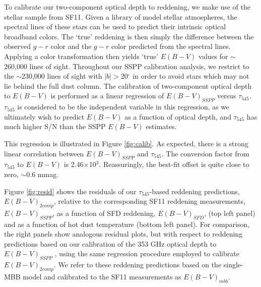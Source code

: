 \documentclass{emulateapj}
\begin{document}
To calibrate our two-component optical depth to reddening, we make use of the 
stellar sample from SF11. Given a library of model stellar atmospheres, the 
spectral lines of these stars can be used to predict their intrinsic optical 
broadband colors. The `true' reddening is then simply the difference between 
the observed $g-r$ color and the $g-r$ color predicted from the spectral lines.
Applying a color transformation then yields `true' $E(B-V)$ values for 
$\sim$260,000 lines of sight. Throughout our SSPP calibration analysis, we 
restrict to the $\sim$230,000 lines of sight with $|b|$$>$20$^{\circ}$ in order
to avoid stars which may not lie behind the full dust column. The calibration 
of two-component optical depth to $E(B-V)$ is performed as a linear regression 
of $E(B-V)_{SSPP}$ versus $\tau_{545}$. $\tau_{545}$ is considered to be the 
independent variable in this regression, as we ultimately wish to predict 
$E(B-V)$ as a function of optical depth, and $\tau_{545}$ has much higher S/N 
than the SSPP $E(B-V)$ estimates.



This regression is illustrated in Figure \ref{fig:calib}. As expected, there 
is a strong linear correlation between $E(B-V)_{SSPP}$ and $\tau_{545}$. The 
conversion factor from $\tau_{545}$ to $E(B-V)$ is 2.46$\times$10$^{3}$. 
Reassuringly, the best-fit offset is quite close to zero, $\sim$0.6 mmag.

Figure \ref{fig:resid} shows the residuals of our $\tau_{545}$-based reddening 
predictions, $E(B-V)_{2comp}$, relative to the corresponding SF11 reddening 
measurements, $E(B-V)_{SSPP}$, as a function of SFD reddening, $E(B-V)_{SFD}$, 
(top left panel) and as a function of hot dust temperature (bottom left panel).
For comparison, the right panels show analogous residual plots, but with 
respect to reddening predictions based on our calibration of the 
\cite{planckdust} 353 GHz optical depth to $E(B-V)_{SSPP}$ , using the same 
regression procedure employed to calibrate $E(B-V)_{2comp}$. We refer to these 
reddening predictions based on the \cite{planckdust} single-MBB model and 
calibrated to the SF11 measurements as $E(B-V)_{mbb}$.
\end{document}
